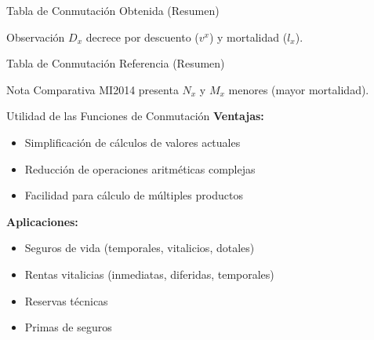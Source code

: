 \begin{frame}{Tabla de Conmutación Obtenida (Resumen)}
  \vspace{-0.4cm}
  \tiny
  
  
  \vspace{0.1cm}
  
  \begin{alertblock}{Observación}
    \small
    $D_x$ decrece por descuento ($v^x$) y mortalidad ($l_x$).
  \end{alertblock}
\end{frame}

\begin{frame}{Tabla de Conmutación Referencia (Resumen)}
  \vspace{-0.4cm}
  \tiny
  
  
  \vspace{0.1cm}
  
  \begin{block}{Nota Comparativa}
    \small
    MI2014 presenta $N_x$ y $M_x$ menores (mayor mortalidad).
  \end{block}
\end{frame}

\begin{frame}{Utilidad de las Funciones de Conmutación}
  \textbf{Ventajas:}
  \begin{itemize}
    \item Simplificación de cálculos de valores actuales
    \item Reducción de operaciones aritméticas complejas
    \item Facilidad para cálculo de múltiples productos
  \end{itemize}
  
  \vspace{0.5cm}
  
  \textbf{Aplicaciones:}
  \begin{itemize}
    \item Seguros de vida (temporales, vitalicios, dotales)
    \item Rentas vitalicias (inmediatas, diferidas, temporales)
    \item Reservas técnicas
    \item Primas de seguros
  \end{itemize}
\end{frame}

